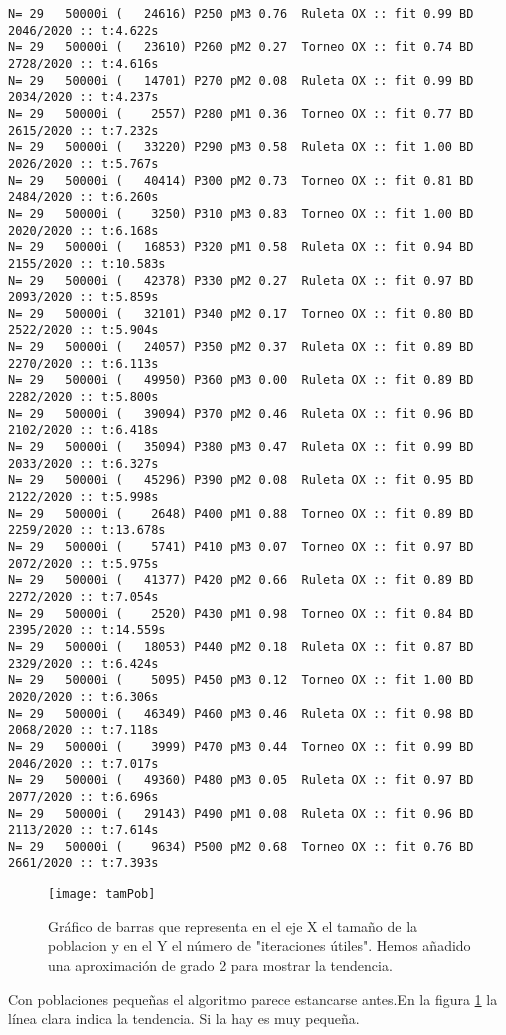 \documentclass[10pt]{article}
\begin{document}
\begin{Verbatim}
N= 29   50000i (   24616) P250 pM3 0.76  Ruleta OX :: fit 0.99 BD 2046/2020 :: t:4.622s
N= 29   50000i (   23610) P260 pM2 0.27  Torneo OX :: fit 0.74 BD 2728/2020 :: t:4.616s
N= 29   50000i (   14701) P270 pM2 0.08  Ruleta OX :: fit 0.99 BD 2034/2020 :: t:4.237s
N= 29   50000i (    2557) P280 pM1 0.36  Torneo OX :: fit 0.77 BD 2615/2020 :: t:7.232s
N= 29   50000i (   33220) P290 pM3 0.58  Ruleta OX :: fit 1.00 BD 2026/2020 :: t:5.767s
N= 29   50000i (   40414) P300 pM2 0.73  Torneo OX :: fit 0.81 BD 2484/2020 :: t:6.260s
N= 29   50000i (    3250) P310 pM3 0.83  Torneo OX :: fit 1.00 BD 2020/2020 :: t:6.168s
N= 29   50000i (   16853) P320 pM1 0.58  Ruleta OX :: fit 0.94 BD 2155/2020 :: t:10.583s
N= 29   50000i (   42378) P330 pM2 0.27  Ruleta OX :: fit 0.97 BD 2093/2020 :: t:5.859s
N= 29   50000i (   32101) P340 pM2 0.17  Torneo OX :: fit 0.80 BD 2522/2020 :: t:5.904s
N= 29   50000i (   24057) P350 pM2 0.37  Ruleta OX :: fit 0.89 BD 2270/2020 :: t:6.113s
N= 29   50000i (   49950) P360 pM3 0.00  Ruleta OX :: fit 0.89 BD 2282/2020 :: t:5.800s
N= 29   50000i (   39094) P370 pM2 0.46  Ruleta OX :: fit 0.96 BD 2102/2020 :: t:6.418s
N= 29   50000i (   35094) P380 pM3 0.47  Ruleta OX :: fit 0.99 BD 2033/2020 :: t:6.327s
N= 29   50000i (   45296) P390 pM2 0.08  Ruleta OX :: fit 0.95 BD 2122/2020 :: t:5.998s
N= 29   50000i (    2648) P400 pM1 0.88  Torneo OX :: fit 0.89 BD 2259/2020 :: t:13.678s
N= 29   50000i (    5741) P410 pM3 0.07  Torneo OX :: fit 0.97 BD 2072/2020 :: t:5.975s
N= 29   50000i (   41377) P420 pM2 0.66  Ruleta OX :: fit 0.89 BD 2272/2020 :: t:7.054s
N= 29   50000i (    2520) P430 pM1 0.98  Torneo OX :: fit 0.84 BD 2395/2020 :: t:14.559s
N= 29   50000i (   18053) P440 pM2 0.18  Ruleta OX :: fit 0.87 BD 2329/2020 :: t:6.424s
N= 29   50000i (    5095) P450 pM3 0.12  Torneo OX :: fit 1.00 BD 2020/2020 :: t:6.306s
N= 29   50000i (   46349) P460 pM3 0.46  Ruleta OX :: fit 0.98 BD 2068/2020 :: t:7.118s
N= 29   50000i (    3999) P470 pM3 0.44  Torneo OX :: fit 0.99 BD 2046/2020 :: t:7.017s
N= 29   50000i (   49360) P480 pM3 0.05  Ruleta OX :: fit 0.97 BD 2077/2020 :: t:6.696s
N= 29   50000i (   29143) P490 pM1 0.08  Ruleta OX :: fit 0.96 BD 2113/2020 :: t:7.614s
N= 29   50000i (    9634) P500 pM2 0.68  Torneo OX :: fit 0.76 BD 2661/2020 :: t:7.393s
\end{Verbatim}
\begin{figure}
\texttt{[image: tamPob]}
\caption{Gráfico de barras que representa en el eje X el tamaño de la poblacion y en el Y el número de "iteraciones útiles". Hemos añadido una aproximación de grado 2 para mostrar la tendencia.}
\label{fig:tamPob}
\end{figure}
Con poblaciones pequeñas el algoritmo parece estancarse antes.En la figura \ref{fig:tamPob} la línea clara indica la tendencia. Si la hay es muy pequeña.
\end{document}
